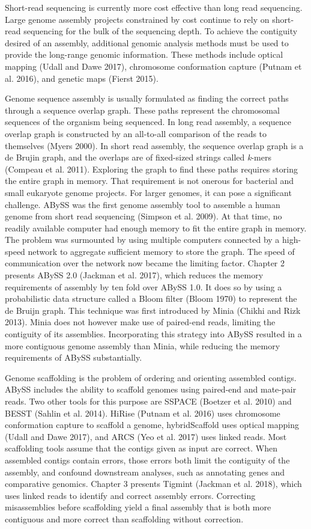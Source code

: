 \documentclass[
  12pt,
  oneside,
  openany]{book}
\begin{document}
Short-read sequencing is currently more cost effective than long read sequencing. Large genome assembly projects constrained by cost continue to rely on short-read sequencing for the bulk of the sequencing depth. To achieve the contiguity desired of an assembly, additional genomic analysis methods must be used to provide the long-range genomic information. These methods include optical mapping (Udall and Dawe 2017), chromosome conformation capture (Putnam et al. 2016), and genetic maps (Fierst 2015).

Genome sequence assembly is usually formulated as finding the correct paths through a sequence overlap graph. These paths represent the chromosomal sequences of the organism being sequenced. In long read assembly, a sequence overlap graph is constructed by an all-to-all comparison of the reads to themselves (Myers 2000). In short read assembly, the sequence overlap graph is a de Brujin graph, and the overlaps are of fixed-sized strings called \emph{k}-mers (Compeau et al. 2011). Exploring the graph to find these paths requires storing the entire graph in memory. That requirement is not onerous for bacterial and small eukaryote genome projects. For larger genomes, it can pose a significant challenge. ABySS was the first genome assembly tool to assemble a human genome from short read sequencing (Simpson et al. 2009). At that time, no readily available computer had enough memory to fit the entire graph in memory. The problem was surmounted by using multiple computers connected by a high-speed network to aggregate sufficient memory to store the graph. The speed of communication over the network now became the limiting factor. Chapter 2 presents ABySS 2.0 (Jackman et al. 2017), which reduces the memory requirements of assembly by ten fold over ABySS 1.0. It does so by using a probabilistic data structure called a Bloom filter (Bloom 1970) to represent the de Bruijn graph. This technique was first introduced by Minia (Chikhi and Rizk 2013). Minia does not however make use of paired-end reads, limiting the contiguity of its assemblies. Incorporating this strategy into ABySS resulted in a more contiguous genome assembly than Minia, while reducing the memory requirements of ABySS substantially.

Genome scaffolding is the problem of ordering and orienting assembled contigs. ABySS includes the ability to scaffold genomes using paired-end and mate-pair reads. Two other tools for this purpose are SSPACE (Boetzer et al. 2010) and BESST (Sahlin et al. 2014). HiRise (Putnam et al. 2016) uses chromosome conformation capture to scaffold a genome, hybridScaffold uses optical mapping (Udall and Dawe 2017), and ARCS (Yeo et al. 2017) uses linked reads. Most scaffolding tools assume that the contigs given as input are correct. When assembled contigs contain errors, those errors both limit the contiguity of the assembly, and confound downstream analyses, such as annotating genes and comparative genomics. Chapter 3 presents Tigmint (Jackman et al. 2018), which uses linked reads to identify and correct assembly errors. Correcting misassemblies before scaffolding yield a final assembly that is both more contiguous and more correct than scaffolding without correction.
\end{document}
